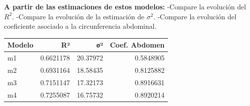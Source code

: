 \documentclass[
  letterpaper,
  DIV=11,
  numbers=noendperiod]{scrartcl}
\newenvironment{Shaded}{\begin{snugshade}}{\end{snugshade}}
\newcommand{\AttributeTok}[1]{\textcolor[rgb]{0.40,0.45,0.13}{#1}}
\newcommand{\ControlFlowTok}[1]{\textcolor[rgb]{0.00,0.23,0.31}{#1}}
\newcommand{\DecValTok}[1]{\textcolor[rgb]{0.68,0.00,0.00}{#1}}
\newcommand{\FunctionTok}[1]{\textcolor[rgb]{0.28,0.35,0.67}{#1}}
\newcommand{\NormalTok}[1]{\textcolor[rgb]{0.00,0.23,0.31}{#1}}
\newcommand{\OtherTok}[1]{\textcolor[rgb]{0.00,0.23,0.31}{#1}}
\newcommand{\SpecialCharTok}[1]{\textcolor[rgb]{0.37,0.37,0.37}{#1}}
\newcommand{\StringTok}[1]{\textcolor[rgb]{0.13,0.47,0.30}{#1}}
\begin{document}
\textbf{A partir de las estimaciones de estos modelos:} -Compare la
evolución del \(R^2\). -Compare la evolución de la estimación de
\(\sigma^2\). -Compare la evolución del coeficiente asociado a la
circunferencia abdominal.

\begin{Shaded}
\end{Shaded}

\begin{longtable}[]{@{}lrrr@{}}
\toprule\noalign{}
Modelo & R² & σ² & Coef. Abdomen \\
\midrule\noalign{}
\endhead
\bottomrule\noalign{}
\endlastfoot
m1 & 0.6621178 & 20.37972 & 0.5848905 \\
m2 & 0.6931164 & 18.58435 & 0.8125882 \\
m3 & 0.7151147 & 17.32173 & 0.8916631 \\
m4 & 0.7255087 & 16.75732 & 0.8920214 \\
\end{longtable}
\end{document}
